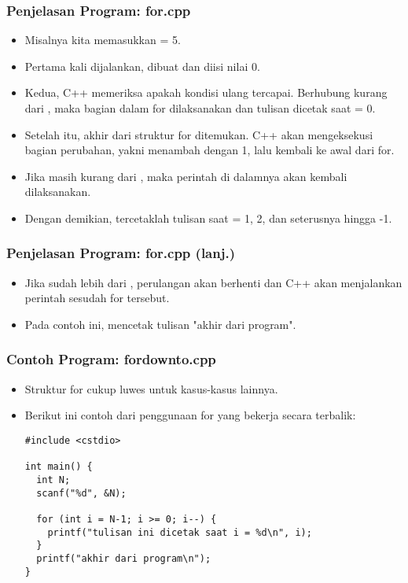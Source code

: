 \begin{frame}
\frametitle{Penjelasan Program: for.cpp}
\begin{itemize}
  \item Misalnya kita memasukkan  = 5.
  \item Pertama kali dijalankan,  dibuat dan diisi nilai 0.
  \item Kedua, C++ memeriksa apakah kondisi ulang tercapai. Berhubung  kurang dari , maka bagian dalam for dilaksanakan dan tulisan dicetak saat  = 0.
  \item Setelah itu, akhir dari struktur for ditemukan. C++ akan mengeksekusi bagian perubahan, yakni menambah  dengan 1, lalu kembali ke awal dari for.
  \item Jika  masih kurang dari , maka perintah di dalamnya akan kembali dilaksanakan.
  \item Dengan demikian, tercetaklah tulisan saat  = 1, 2, dan seterusnya hingga -1.
\end{itemize}
\end{frame}

\begin{frame}
\frametitle{Penjelasan Program: for.cpp (lanj.)}
\begin{itemize}
  \item Jika  sudah lebih dari , perulangan akan berhenti dan C++ akan menjalankan perintah sesudah for tersebut.
  \item Pada contoh ini, mencetak tulisan "akhir dari program".
\end{itemize}
\end{frame}

\begin{frame}[fragile]
\frametitle{Contoh Program: fordownto.cpp}
\begin{itemize}
  \item Struktur for cukup luwes untuk kasus-kasus lainnya.
  \item Berikut ini contoh dari penggunaan for yang bekerja secara terbalik:
\begin{lstlisting}
#include <cstdio>

int main() {
  int N;
  scanf("%d", &N);

  for (int i = N-1; i >= 0; i--) {
    printf("tulisan ini dicetak saat i = %d\n", i);
  }
  printf("akhir dari program\n");
}
\end{lstlisting}
\end{itemize}
\end{frame}

